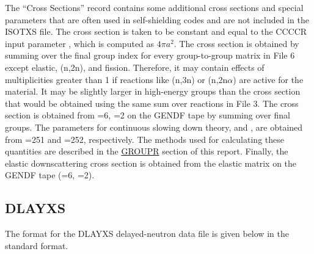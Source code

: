 The ``Cross Sections'' record contains some additional cross sections
and special parameters that are often used in self-shielding codes
and are not included in the ISOTXS file.  The  cross
section is taken to be constant and equal to the CCCCR input parameter
, which is computed as $4\pi a^2$.  The 
cross section is obtained by summing over the final group index for every
group-to-group matrix in File 6 except elastic, (n,2n), and fission.
Therefore, it may contain effects of multiplicities greater than
1 if reactions like (n,3n) or (n,2n$\alpha$) are active for the
material.  It may be slightly larger in high-energy groups
than the cross section that
would be obtained using the same sum over reactions in
File 3.  The  cross section is obtained from =6,
=2 on the GENDF tape by summing over final groups.  The
parameters for continuous slowing down theory,  and
, are obtained from =251
and =252, respectively.  The methods used for calculating these
quantities are described in the
\hyperlink{sGROUPRhy}{GROUPR} section of this report.
Finally, the elastic downscattering cross section is obtained from
the elastic matrix on the GENDF tape (=6, =2).


\subsection{DLAYXS}
\label{ssCCCCR_DLAYXS}

The format for the DLAYXS delayed-neutron data file is given
below in the standard format.

